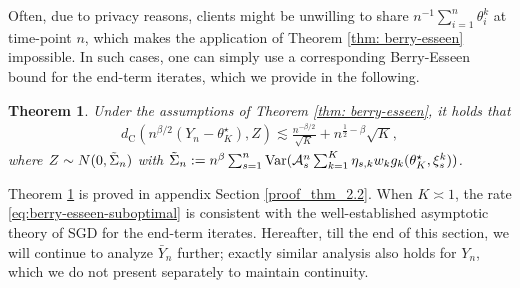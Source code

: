 \documentclass[a4paper,11pt]{article}
\numberwithin{equation}{section}
\theoremstyle{plain}
\newtheorem{theorem}{Theorem}[section]
\theoremstyle{remark}
\newcommand{\minparam}{\theta^\star_K}
\newcommand{\var}{\mathrm{Var}}
\begin{document}
Often, due to privacy reasons, clients might be unwilling to share $n^{-1} \sum_{i=1}^n \theta_i^k$ at time-point $n$, which makes the application of Theorem \ref{thm: berry-esseen} impossible. In such cases, one can simply use a corresponding Berry-Esseen bound for the end-term iterates, which we provide in the following.
\begin{theorem}\label{thm:berry-esseen suboptimal}
    Under the assumptions of Theorem \ref{thm: berry-esseen}, it holds that 
    \begin{align}\label{eq:berry-esseen-suboptimal}
        d_{\mathrm{C}}( n^{\beta/2}({Y}_n - \minparam) , Z)  \lesssim \frac{n^{-\beta/2}}{\sqrt{K}}  + n^{\frac{1}{2}-\beta} \sqrt{K},
    \end{align}
    where $Z \sim N(0, \Tilde{\Sigma}_n)$ with $\Tilde{\Sigma}_n:= n^{\beta}\sum_{s=1}^n \var(\mathcal{A}_s^n \sum_{k=1}^K \eta_{s,k}w_k g_k(\minparam, \xi_s^k))$. 
\end{theorem}
Theorem \ref{thm:berry-esseen suboptimal} is proved in appendix Section \ref{proof_thm_2.2}. When $K\asymp 1$, the rate \eqref{eq:berry-esseen-suboptimal} is consistent with the well-established asymptotic theory of SGD \cite{chung1954,sacks58,fabian} for the end-term iterates. Hereafter, till the end of this section, we will continue to analyze $\bar{Y}_n$ further; exactly similar analysis also holds for $Y_n$, which we do not present separately to maintain continuity.
\end{document}
